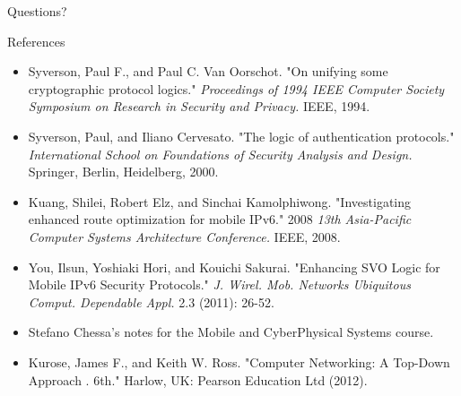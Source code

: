 \documentclass[10pt]{beamer}
\begin{document}
\begin{frame}[standout]
	Questions?
\end{frame}
  
\appendix
\begin{frame}{References}
	\small
	\begin{itemize}
		\item Syverson, Paul F., and Paul C. Van Oorschot. "On unifying some cryptographic protocol logics." \textit{Proceedings of 1994 IEEE Computer Society Symposium on Research in Security and Privacy.} IEEE, 1994.
		\item Syverson, Paul, and Iliano Cervesato. "The logic of authentication protocols." \textit{International School on Foundations of Security Analysis and Design.} Springer, Berlin, Heidelberg, 2000.
		\item Kuang, Shilei, Robert Elz, and Sinchai Kamolphiwong. "Investigating enhanced route optimization for mobile IPv6." 2008 \textit{13th Asia-Pacific Computer Systems Architecture Conference.} IEEE, 2008.
		\item You, Ilsun, Yoshiaki Hori, and Kouichi Sakurai. "Enhancing SVO Logic for Mobile IPv6 Security Protocols." \textit{J. Wirel. Mob. Networks Ubiquitous Comput. Dependable Appl.} 2.3 (2011): 26-52.
		\item Stefano Chessa's notes for the Mobile and CyberPhysical Systems course.
		\item Kurose, James F., and Keith W. Ross. "Computer Networking: A Top-Down Approach . 6th." Harlow, UK: Pearson Education Ltd (2012).
	\end{itemize}
\end{frame}
\end{document}

